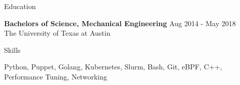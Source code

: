 \documentclass{resume} %
\begin{document}

\begin{rSection}{Education}

{\bf Bachelors of Science, Mechanical Engineering } \hfill { Aug 2014 - May 2018} 
\\{ { The University of Texas at Austin}} 

\end{rSection}

\begin{rSection}{Skills}

Python, Puppet, Golang, Kubernetes, Slurm, Bash, Git, eBPF, C++, Performance
  Tuning, Networking


\end{rSection}
\end{document}
